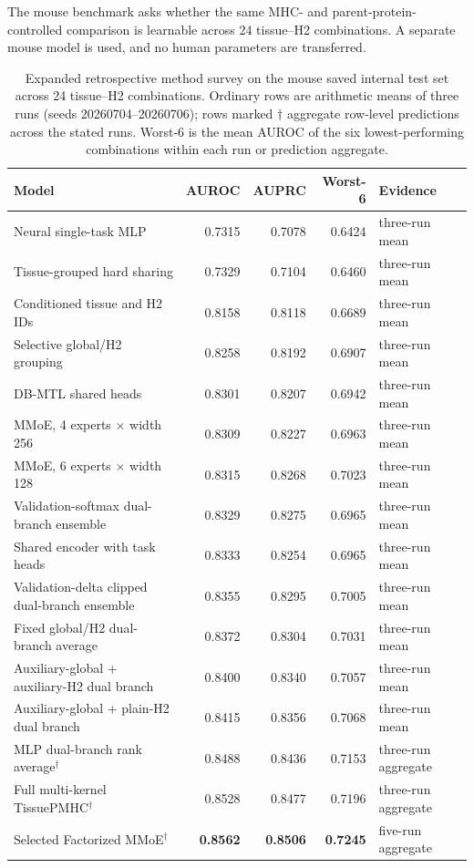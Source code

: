 The mouse benchmark asks whether the same MHC- and parent-protein-controlled comparison is learnable across 24 tissue--H2 combinations. A separate mouse model is used, and no human parameters are transferred.

\begin{table}[t]
\centering
\caption{Expanded retrospective method survey on the mouse saved internal test set across 24 tissue--H2 combinations. Ordinary rows are arithmetic means of three runs (seeds 20260704--20260706); rows marked $\dagger$ aggregate row-level predictions across the stated runs. Worst-6 is the mean AUROC of the six lowest-performing combinations within each run or prediction aggregate.}
\label{tab:mouse-baselines}
\footnotesize
\renewcommand{\arraystretch}{1.06}
\setlength{\tabcolsep}{2.5pt}
\begin{tabularx}{\textwidth}{>{\raggedright\arraybackslash}Xrrr
                            >{\raggedright\arraybackslash}p{2.5cm}}
\toprule
Model & AUROC & AUPRC & Worst-6 & Evidence \\ 
\midrule
Neural single-task MLP & 0.7315 & 0.7078 & 0.6424 & three-run mean \\
Tissue-grouped hard sharing & 0.7329 & 0.7104 & 0.6460 & three-run mean \\
Conditioned tissue and H2 IDs & 0.8158 & 0.8118 & 0.6689 & three-run mean \\
Selective global/H2 grouping & 0.8258 & 0.8192 & 0.6907 & three-run mean \\
DB-MTL shared heads & 0.8301 & 0.8207 & 0.6942 & three-run mean \\
MMoE, 4 experts $\times$ width 256 & 0.8309 & 0.8227 & 0.6963 & three-run mean \\
MMoE, 6 experts $\times$ width 128 & 0.8315 & 0.8268 & 0.7023 & three-run mean \\
Validation-softmax dual-branch ensemble & 0.8329 & 0.8275 & 0.6965 & three-run mean \\
Shared encoder with task heads & 0.8333 & 0.8254 & 0.6965 & three-run mean \\
Validation-delta clipped dual-branch ensemble & 0.8355 & 0.8295 & 0.7005 & three-run mean \\
Fixed global/H2 dual-branch average & 0.8372 & 0.8304 & 0.7031 & three-run mean \\
Auxiliary-global + auxiliary-H2 dual branch & 0.8400 & 0.8340 & 0.7057 & three-run mean \\
Auxiliary-global + plain-H2 dual branch & 0.8415 & 0.8356 & 0.7068 & three-run mean \\
MLP dual-branch rank average$^\dagger$ & 0.8488 & 0.8436 & 0.7153 & three-run aggregate \\
Full multi-kernel TissuePMHC$^\dagger$ & 0.8528 & 0.8477 & 0.7196 & three-run aggregate \\
Selected Factorized MMoE$^\dagger$ & \textbf{0.8562} & \textbf{0.8506} & \textbf{0.7245} & five-run aggregate \\
\bottomrule
\end{tabularx}
\end{table}

